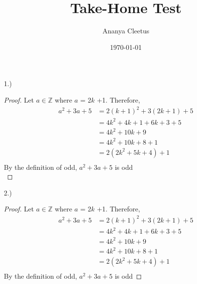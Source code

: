 \documentclass[a4paper]{article}
\begin{document}
\title{Take-Home Test}

\author{Ananya Cleetus}

\date{\today}



\maketitle


1.)
\\
\begin{proof}
 Let $a \in \mathbb{Z}$ where $a$ = 2$k$ +1. Therefore,
  \begin{align*}
    a^2 + 3a + 5 &= 2(k+1)^2 + 3(2k+1) + 5 \\
    &= 4k^2 + 4k +1 + 6k + 3 +5 \\
    &= 4k^2 + 10k + 9 \\
    &= 4k^2 + 10k + 8 + 1 \\
    &= 2(2k^2 + 5k + 4) +1 \\
  \end{align*}
  By the definition of odd, $a^2+3a+5$ is odd \\
 
\end{proof}


2.)
\\
\begin{proof}
 Let $a \in \mathbb{Z}$ where $a$ = 2$k$ +1. Therefore,
  \begin{align*}
    a^2 + 3a + 5 &= 2(k+1)^2 + 3(2k+1) + 5 \\
    &= 4k^2 + 4k +1 + 6k + 3 +5 \\
    &= 4k^2 + 10k + 9 \\
    &= 4k^2 + 10k + 8 + 1 \\
    &= 2(2k^2 + 5k + 4) +1 \\
  \end{align*}
  By the definition of odd, $a^2+3a+5$ is odd
\end{proof}
\end{document}
